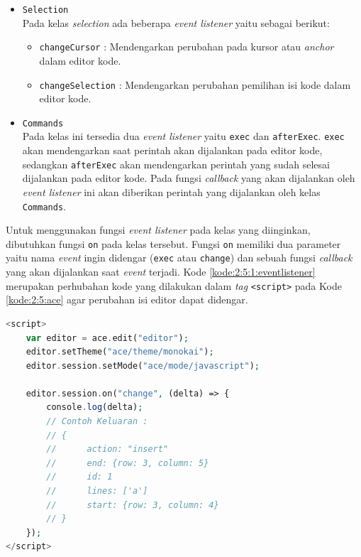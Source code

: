 \documentclass[a4paper,twoside]{article}
\begin{document}
\begin{enumerate}
\begin{itemize}
		      \item \verb|Selection| \\
		            Pada kelas \textit{selection} ada beberapa \textit{event listener} yaitu sebagai berikut:

		            \begin{itemize}
			            \item \verb|changeCursor| : Mendengarkan perubahan pada kursor atau \textit{anchor} dalam editor kode.
			            \item \verb|changeSelection| : Mendengarkan perubahan pemilihan isi kode dalam editor kode.
		            \end{itemize}

		      \item \verb|Commands| \\
		            Pada kelas ini tersedia dua \textit{event listener} yaitu \verb|exec| dan \verb|afterExec|. \verb|exec| akan mendengarkan saat perintah akan dijalankan pada editor kode, sedangkan \verb|afterExec| akan mendengarkan perintah yang sudah selesai dijalankan pada editor kode. Pada fungsi \textit{callback} yang akan dijalankan oleh \textit{event listener} ini akan diberikan perintah yang dijalankan oleh kelas \verb|Commands|.
	      \end{itemize}

	      Untuk menggunakan fungsi \textit{event listener} pada kelas yang diinginkan, dibutuhkan fungsi \verb|on| pada kelas tersebut. Fungsi \verb|on| memiliki dua parameter yaitu nama \textit{event} ingin didengar (\verb|exec| atau \verb|change|) dan sebuah fungsi \textit{callback} yang akan dijalankan saat \textit{event} terjadi. Kode \ref{kode:2:5:1:eventlistener} merupakan perhubahan kode yang dilakukan dalam \textit{tag} \verb|<script>| pada Kode \ref{kode:2:5:ace} agar perubahan isi editor dapat didengar.

	      \begin{lstlisting}[language={php}, caption={Contoh kode event listener}, label={kode:2:5:1:eventlistener}]
<script>
	var editor = ace.edit("editor");
	editor.setTheme("ace/theme/monokai");
	editor.session.setMode("ace/mode/javascript");

	editor.session.on("change", (delta) => {
        console.log(delta);
		// Contoh Keluaran :
		// {
		// 		action: "insert"
		// 		end: {row: 3, column: 5}
		// 		id: 1
		// 		lines: ['a']
		// 		start: {row: 3, column: 4}
		// }
	});
</script>
\end{lstlisting}


\end{enumerate}
\end{document}
